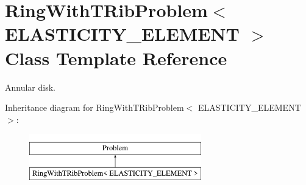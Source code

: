 \hypertarget{classRingWithTRibProblem}{}\section{Ring\+With\+T\+Rib\+Problem$<$ E\+L\+A\+S\+T\+I\+C\+I\+T\+Y\+\_\+\+E\+L\+E\+M\+E\+NT $>$ Class Template Reference}
\label{classRingWithTRibProblem}


Annular disk.  


Inheritance diagram for Ring\+With\+T\+Rib\+Problem$<$ E\+L\+A\+S\+T\+I\+C\+I\+T\+Y\+\_\+\+E\+L\+E\+M\+E\+NT $>$\+:\begin{figure}[H]
\begin{center}
\leavevmode
\includegraphics[height=2.000000cm]{classRingWithTRibProblem}
\end{center}
\end{figure}
